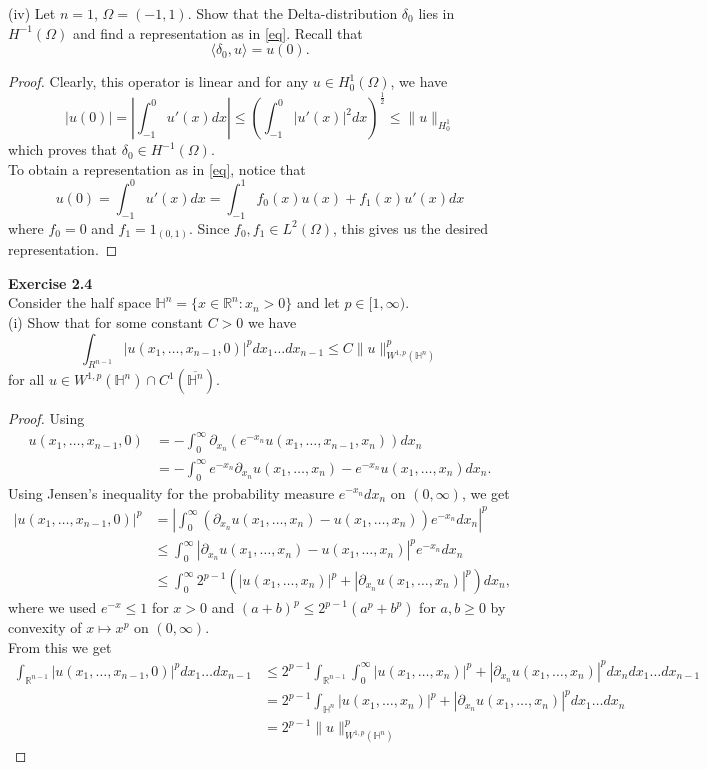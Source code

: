 \documentclass{article}
\newcommand{\R}{\mathbb{R}}
\begin{document}
(iv) Let $n=1$, $\Omega=(-1,1)$. Show that the Delta-distribution $\delta_0$ lies in $H^{-1}(\Omega)$ and find a representation as in \eqref{eq}. Recall that
\[
\langle \delta_0,u\rangle=u(0).
\]
\begin{proof}
Clearly, this operator is linear and for any $u\in H_0^1(\Omega)$, we have
\[
|u(0)|=\left|\int_{-1}^0u'(x)dx\right|\leq\left(\int_{-1}^0|u'(x)|^2dx\right)^\frac{1}{2}\leq\lVert u\rVert_{H_0^1}
\]
which proves that $\delta_0\in H^{-1}(\Omega)$.\\
To obtain a representation as in \eqref{eq}, notice that
\[
u(0)=\int_{-1}^0u'(x)dx=\int_{-1}^1 f_0(x)u(x)+f_1(x)u'(x)dx
\]
where $f_0=0$ and $f_1=1_{(0,1)}$. Since $f_0,f_1\in L^2(\Omega)$, this gives us the desired representation.
\end{proof}
\textbf{Exercise 2.4}\\
Consider the half space $\mathbb{H}^n=\{x\in\R^n:x_n>0\}$ and let $p\in[1,\infty)$.\\
(i) Show that for some constant $C>0$ we have
\[
\int_{R^{n-1}}|u(x_1,\dots,x_{n-1},0)|^pdx_1\dots dx_{n-1}\leq C\lVert u\rVert_{W^{1,p}(\mathbb{H}^n)}^p 
\]
for all $u\in W^{1,p}(\mathbb{H}^n)\cap C^1(\overline{\mathbb{H}^n})$.
\begin{proof}
    Using 
    \[
    \begin{aligned}
    u(x_1,\dots,x_{n-1},0)&=-\int_0^\infty \partial_{x_n}\left(e^{-x_n}u(x_1,\dots,x_{n-1},x_n)\right)dx_n\\
    &=-\int_0^\infty e^{-x_n}\partial_{x_n}u(x_1,\dots,x_n)-e^{-x_n}u(x_1,\dots,x_n)dx_n.
    \end{aligned}
    \]
    Using Jensen's inequality for the probability measure $e^{-x_n}dx_n$ on $(0,\infty)$, we get
    \[
    \begin{aligned}
    |u(x_1,\dots,x_{n-1},0)|^p&=\left|\int_{0}^\infty (\partial_{x_n}u(x_1,\dots,x_n)-u(x_1,\dots,x_n))e^{-x_n}dx_n\right|^p\\
    &\leq\int_0^\infty |\partial_{x_n}u(x_1,\dots,x_n)-u(x_1,\dots,x_n)|^pe^{-x_n}dx_n\\
    &\leq\int_0^\infty 2^{p-1}(|u(x_1,\dots,x_n)|^p+|\partial_{x_n}u(x_1,\dots,x_n)|^p)dx_n,
    \end{aligned}
    \]
    where we used $e^{-x}\leq 1$ for $x>0$ and $(a+b)^p\leq 2^{p-1}(a^p+b^p)$ for $a,b\geq 0$ by convexity of $x\mapsto x^p$ on $(0,\infty)$.\\
    From this we get
    \[
    \begin{aligned}
        \int_{\R^{n-1}}|u(x_1,\dots,x_{n-1},0)|^pdx_1\dots dx_{n-1}&\leq 2^{p-1}\int_{\R^{n-1}}\int_0^\infty |u(x_1,\dots,x_n)|^p+|\partial_{x_n}u(x_1,\dots,x_n)|^pdx_ndx_1\dots dx_{n-1}\\
        &=2^{p-1}\int_{\mathbb{H}^n}|u(x_1,\dots,x_n)|^p+|\partial_{x_n} u(x_1,\dots,x_n)|^pdx_1\dots dx_n\\
        &=2^{p-1}\lVert u\rVert_{W^{1,p}(\mathbb{H}^n)}^p
    \end{aligned}
    \]
\end{proof}
\end{document}
